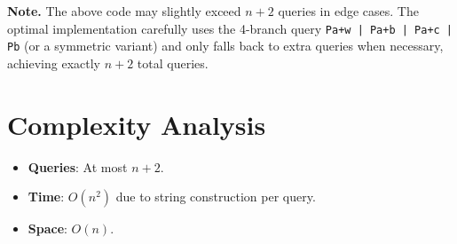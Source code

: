 \documentclass[11pt,a4paper]{article}
\begin{document}
\textbf{Note.} The above code may slightly exceed $n+2$ queries in edge cases. The optimal implementation carefully uses the 4-branch query \texttt{Pa+w | Pa+b | Pa+c | Pb} (or a symmetric variant) and only falls back to extra queries when necessary, achieving exactly $n+2$ total queries.

\section{Complexity Analysis}

\begin{itemize}
  \item \textbf{Queries}: At most $n + 2$.
  \item \textbf{Time}: $O(n^2)$ due to string construction per query.
  \item \textbf{Space}: $O(n)$.
\end{itemize}
\end{document}
